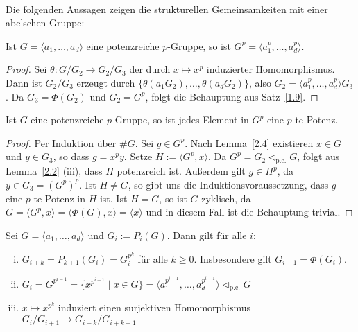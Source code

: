\documentclass[11pt,a4paper,openany]{memoir}
\begin{document}
\paragraph{} Die folgenden Aussagen zeigen die strukturellen Gemeinsamkeiten mit einer abelschen Gruppe:

\begin{lemma}\label{2.5}
Ist $G=\langle a_1,\ldots,a_d\rangle$ eine potenzreiche $p$-Gruppe, so ist $G^p=\langle a_1^p,\ldots,a_d^p\rangle$.
\end{lemma}

\begin{proof}
Sei $\theta:G/G_2\to G_2/G_3$ der durch $x\mapsto x^p$ induzierter Homomorphismus. Dann ist $G_2/G_3$ erzeugt durch $\{\theta(a_1G_2),\ldots,\theta(a_dG_2) \}$, also $G_2=\langle a_1^p,\ldots,a_d^p\rangle G_3$. Da $G_3=\Phi(G_2)$ und $G_2=G^p$, folgt die Behauptung aus Satz~\ref{1.9}.
\end{proof}

\begin{proposition}\label{2.6}
Ist $G$ eine potenzreiche $p$-Gruppe, so ist jedes Element in $G^p$ eine $p$-te Potenz.
\end{proposition}

\begin{proof}
Per Induktion über $\#G$. Sei $g\in G^p$. Nach Lemma~\ref{2.4} existieren $x\in G$ und $y\in G_3$, so dass $g=x^py$. Setze $H:=\langle G^p,x\rangle$. Da $G^p=G_2\lhd_\text{p.e.}G$, folgt aus Lemma~\ref{2.2} (iii), dass $H$ potenzreich ist. Außerdem gilt $g\in H^p$, da $y\in G_3=(G^p)^p$. Ist $H\neq G$, so gibt uns die Induktionsvoraussetzung, dass $g$ eine $p$-te Potenz in $H$ ist. Ist $H=G$, so ist $G$ zyklisch, da $G=\langle G^p,x\rangle=\langle \Phi(G),x\rangle=\langle x\rangle$ und in diesem Fall ist die Behauptung trivial.
\end{proof}

\begin{theorem}\label{2.7}
Sei $G=\langle a_1,\ldots,a_d\rangle$ und $G_i:=P_i(G)$. Dann gilt für alle $i$:
\begin{enumerate}[(i)]
\item $G_{i+k}=P_{k+1}(G_i)=G_i^{p^k}$ für alle $k\geq 0$. Insbesondere gilt $G_{i+1}=\Phi(G_i)$.
\item $G_i=G^{p^{i-1}}=\{x^{p^{i-1}}\mid x\in G\}=\langle a_1^{p^{i-1}},\ldots,a_d^{p^{i-1}}\rangle\lhd_\text{p.e.}G$
\item $x\mapsto x^{p^k}$ induziert einen surjektiven Homomorphismus $G_i/G_{i+1}\to G_{i+k}/G_{i+k+1}$
\end{enumerate}
\end{theorem}
\end{document}
